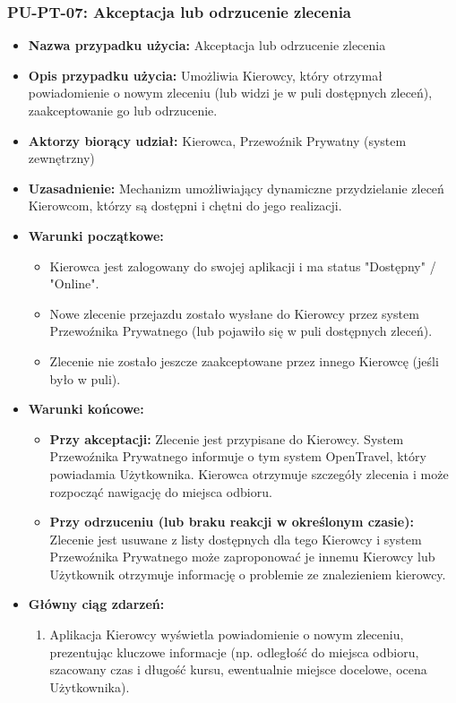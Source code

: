 \documentclass[a4paper,12pt]{article}
\begin{document}
\subsubsection{PU-PT-07: Akceptacja lub odrzucenie zlecenia}
\begin{itemize}
    \item \textbf{Nazwa przypadku użycia:} Akceptacja lub odrzucenie zlecenia
    \item \textbf{Opis przypadku użycia:} Umożliwia Kierowcy, który otrzymał powiadomienie o nowym zleceniu (lub widzi je w puli dostępnych zleceń), zaakceptowanie go lub odrzucenie.
    \item \textbf{Aktorzy biorący udział:} Kierowca, Przewoźnik Prywatny (system zewnętrzny)
    \item \textbf{Uzasadnienie:} Mechanizm umożliwiający dynamiczne przydzielanie zleceń Kierowcom, którzy są dostępni i chętni do jego realizacji.
    \item \textbf{Warunki początkowe:}
        \begin{itemize}
            \item Kierowca jest zalogowany do swojej aplikacji i ma status "Dostępny" / "Online".
            \item Nowe zlecenie przejazdu zostało wysłane do Kierowcy przez system Przewoźnika Prywatnego (lub pojawiło się w puli dostępnych zleceń).
            \item Zlecenie nie zostało jeszcze zaakceptowane przez innego Kierowcę (jeśli było w puli).
        \end{itemize}
    \item \textbf{Warunki końcowe:}
        \begin{itemize}
            \item \textbf{Przy akceptacji:} Zlecenie jest przypisane do Kierowcy. System Przewoźnika Prywatnego informuje o tym system OpenTravel, który powiadamia Użytkownika. Kierowca otrzymuje szczegóły zlecenia i może rozpocząć nawigację do miejsca odbioru.
            \item \textbf{Przy odrzuceniu (lub braku reakcji w określonym czasie):} Zlecenie jest usuwane z listy dostępnych dla tego Kierowcy i system Przewoźnika Prywatnego może zaproponować je innemu Kierowcy lub Użytkownik otrzymuje informację o problemie ze znalezieniem kierowcy.
        \end{itemize}
    \item \textbf{Główny ciąg zdarzeń:}
        \begin{enumerate}
            \item Aplikacja Kierowcy wyświetla powiadomienie o nowym zleceniu, prezentując kluczowe informacje (np. odległość do miejsca odbioru, szacowany czas i długość kursu, ewentualnie miejsce docelowe, ocena Użytkownika).

\end{enumerate}
\end{itemize}
\end{document}
